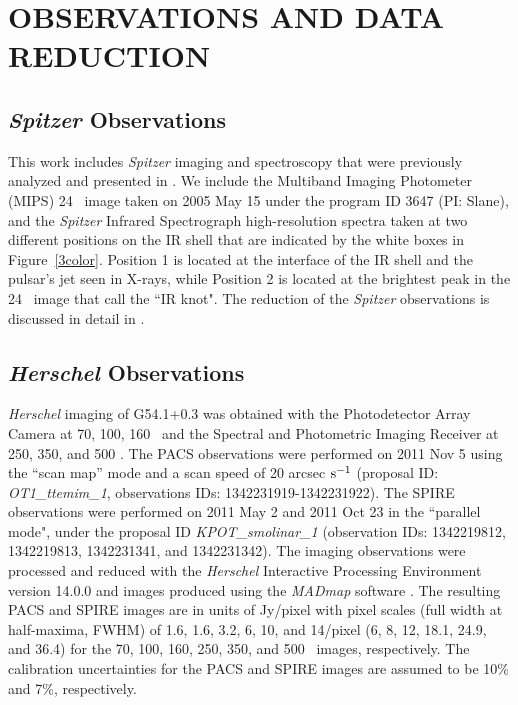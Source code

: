 \documentclass{emulateapj}
\newcommand{\spitzer}{\textit{Spitzer }}
\newcommand{\herschel}{\textit{Herschel }}
\begin{document}



\section{OBSERVATIONS AND DATA REDUCTION} \label{obsv}

\subsection{\textit{Spitzer} Observations}

This work includes \textit{Spitzer} imaging and spectroscopy that were previously analyzed and presented in \citet{temim10}. 
We include the Multiband Imaging Photometer (MIPS) 24 \micron\ image taken on 2005 May 15 under the program ID 3647 (PI: Slane), and the \spitzer Infrared Spectrograph \citep[IRS;][]{houck04} high-resolution spectra taken at two different positions on the IR shell that are indicated by the white boxes in Figure~\ref{3color}. Position 1 is located at the interface of the IR shell and the pulsar's jet seen in X-rays, while Position 2 is located at the brightest peak in the 24 \micron\ image that \citet{temim10} call the ``IR knot". The reduction of the \textit{Spitzer} observations is discussed in detail in \citet{temim10}.

\subsection{\textit{Herschel} Observations}

\herschel imaging of G54.1+0.3 was obtained with the Photodetector Array Camera \citep[PACS;][]{poglitsch10} at 70, 100, 160 \micron\, and the Spectral and Photometric Imaging Receiver \citep[SPIRE;][]{griffin10} at 250, 350, and 500 \micron. The PACS observations were performed on 2011 Nov 5 using the ``scan map'' mode and a scan speed of 20 arcsec $\rm s^{-1}$ (proposal ID: \textit{OT1\_ttemim\_1}, observations IDs: 1342231919-1342231922). The SPIRE observations were performed on 2011 May 2 and 2011 Oct 23 in the ``parallel mode", under the proposal ID \textit{KPOT\_smolinar\_1} (observation IDs: 1342219812, 1342219813, 1342231341, and 1342231342). The imaging observations were processed and reduced with the \textit{Herschel} Interactive Processing Environment \citep[HIPE;][]{ott10} version 14.0.0 and images produced using the \textit{MADmap} software \citep{cantalupo09}. The resulting PACS and SPIRE images are in units of Jy/pixel with pixel scales (full width at half-maxima, FWHM) of 1.6, 1.6, 3.2, 6, 10, and 14\arcsec/pixel (6, 8, 12, 18.1, 24.9, and 36.4\arcsec) for the 70, 100, 160, 250, 350, and 500 \micron\ images, respectively. The calibration uncertainties for the PACS and SPIRE images are assumed to be 10\% and 7\%, respectively.
\end{document}
